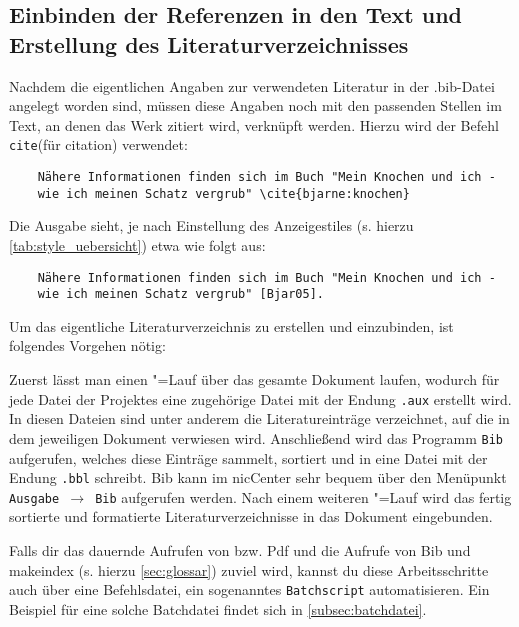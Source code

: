 \subsection{Einbinden der Referenzen in den Text und Erstellung des
Literaturverzeichnisses}
Nachdem die eigentlichen Angaben zur verwendeten Literatur in der .bib-Datei
angelegt worden sind, müssen diese Angaben noch mit den passenden Stellen im
Text, an denen das Werk zitiert wird, verknüpft werden.
Hierzu wird der Befehl \texttt{cite{}}(für citation) verwendet:
\begin{verbatim}
	Nähere Informationen finden sich im Buch "Mein Knochen und ich -
	wie ich meinen Schatz vergrub" \cite{bjarne:knochen}
\end{verbatim}
\newpage
Die Ausgabe sieht, je nach Einstellung des Anzeigestiles (s. hierzu 
\cref{tab:style_uebersicht}) etwa wie folgt aus:
\begin{verbatim}
	Nähere Informationen finden sich im Buch "Mein Knochen und ich -
	wie ich meinen Schatz vergrub" [Bjar05].
\end{verbatim}
Um das eigentliche Literaturverzeichnis zu erstellen und einzubinden, ist folgendes Vorgehen
nötig:

Zuerst lässt man einen \DMLLaTeX"=Lauf über das gesamte Dokument laufen, wodurch
für jede Datei der Projektes eine zugehörige Datei mit der Endung \texttt{.aux}
erstellt wird. In diesen Dateien sind unter anderem die Literatureinträge
verzeichnet, auf die in dem jeweiligen Dokument verwiesen wird.
Anschließend wird das Programm \texttt{Bib\DMLTeX} aufgerufen, welches diese Einträge
sammelt, sortiert und in eine Datei mit der Endung \texttt{.bbl} schreibt.
Bib\DMLTeX{} kann im \DMLTeX nicCenter sehr bequem über den Menüpunkt \texttt{Ausgabe
$\rightarrow$ Bib\DMLTeX} aufgerufen werden. Nach einem weiteren \DMLLaTeX"=Lauf wird
das fertig sortierte und formatierte Literaturverzeichnisse in das Dokument
eingebunden.

Falls dir das dauernde Aufrufen von \DMLLaTeX{} bzw. Pdf\DMLTeX{} und die Aufrufe von
Bib\DMLTeX{} und makeindex (s. hierzu \cref{sec:glossar}) zuviel wird, kannst du diese
Arbeitsschritte auch über eine Befehlsdatei, ein sogenanntes \texttt{Batchscript}
automatisieren. Ein Beispiel für eine solche Batchdatei findet sich in 
\cref{subsec:batchdatei}.
